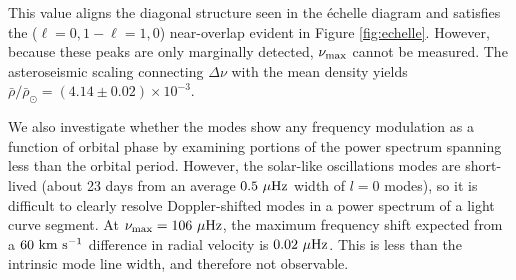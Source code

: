 This value aligns the diagonal structure seen in the \'echelle diagram and satisfies the ($\ell=0,1-\ell=1,0$) near-overlap evident in Figure \ref{fig:echelle}. However, because these peaks are only marginally detected, $\nu_{\rm{max}}$ cannot be measured. The asteroseismic scaling connecting $\Delta\nu$ with the mean density yields $\bar{\rho}/\bar{\rho}_\odot = (4.14 \pm 0.02)\times 10^{-3}$. 

We also investigate whether the modes show any frequency modulation as a function of orbital phase by examining portions of the power spectrum spanning less than the orbital period. However, the solar-like oscillations modes are short-lived (about 23 days from an average $0.5 \ \mu\rm{Hz}$ width of $l=0$ modes), so it is difficult to clearly resolve Doppler-shifted modes in a power spectrum of a light curve segment. At $\nu_{\rm{max}} = 106 \ \mu \rm{Hz}$, the maximum frequency shift expected from a $60 \ \rm{km} \ \rm{s}^{-1}$ difference in radial velocity is $0.02 \ \mu \rm{Hz}$. This is less than the intrinsic mode line width, and therefore not observable.
